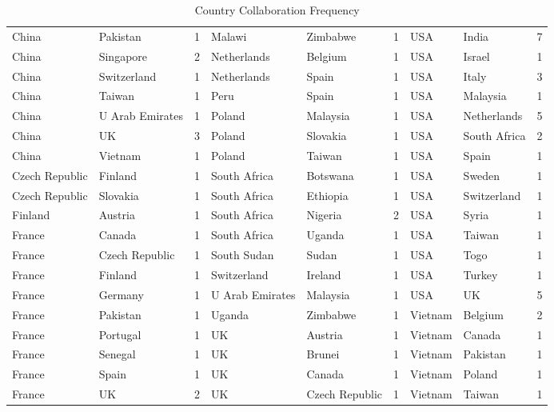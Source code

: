 \begin{table}[ht]
\begin{tabular}{llr|llr|llr}
China & Pakistan & 1 & Malawi & Zimbabwe & 1 & USA & India & 7\\
China & Singapore & 2 & Netherlands & Belgium & 1 & USA & Israel & 1\\ 
China & Switzerland & 1 & Netherlands & Spain & 1 & USA & Italy & 3\\
China & Taiwan & 1 & Peru & Spain & 1 & USA & Malaysia & 1\\ 
China & U Arab Emirates & 1 & Poland & Malaysia & 1 & USA & Netherlands & 5\\ 
China & UK & 3 & Poland & Slovakia & 1 & USA & South Africa & 2\\
China & Vietnam & 1 & Poland & Taiwan & 1 & USA & Spain & 1\\
Czech Republic & Finland & 1 & South Africa & Botswana & 1 & USA & Sweden & 1\\
Czech Republic & Slovakia & 1 & South Africa & Ethiopia & 1 & USA & Switzerland & 1\\ 
Finland & Austria & 1 & South Africa & Nigeria & 2 & USA & Syria & 1\\
France & Canada & 1 & South Africa & Uganda & 1 & USA & Taiwan & 1\\
France & Czech Republic & 1 & South Sudan & Sudan & 1 & USA & Togo & 1\\
France & Finland & 1 & Switzerland & Ireland & 1 & USA & Turkey & 1\\
France & Germany & 1 & U Arab Emirates & Malaysia & 1 & USA & UK & 5\\
France & Pakistan & 1 & Uganda & Zimbabwe & 1 & Vietnam & Belgium & 2\\
France & Portugal & 1 & UK & Austria & 1 & Vietnam & Canada & 1\\
France & Senegal & 1 & UK & Brunei & 1 & Vietnam & Pakistan & 1\\ 
France & Spain & 1 & UK & Canada & 1 & Vietnam & Poland & 1\\ 
France & UK & 2 & UK & Czech Republic & 1 & Vietnam & Taiwan & 1\\
	\bottomrule 
\end{tabular}
\caption{Country Collaboration Frequency} 
\label{tab:Country-Collaboration-Frequency}
\end{table}